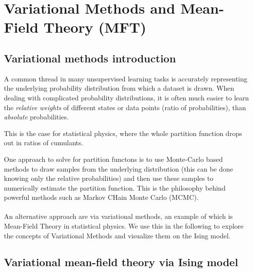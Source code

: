 \section{Variational Methods and Mean-Field Theory (MFT)}
\label{sec:varMFT}
\subsection{Variational methods introduction}
A common thread in many unsupervised learning tasks is accurately representing the underlying probability distribution from which a dataset is drawn. When dealing with complicated probability distributions, it is often much easier to learn the \emph{relative weights} of different states or data points (ratio of probabilities), than \emph{absolute} probabilities. 
\begin{example}
	This is the case for statistical physics, where the whole partition function drops out in ratios of cumulants. 
\end{example}
One approach to solve for partition functons is to use Monte-Carlo based methods to draw samples from the underlying distribution (this can be done knowing only the relative probabilities) and then use these samples to numerically estimate the partition function. This is the philosophy behind powerful methods such as Markov CHain Monte Carlo (MCMC).\\
\\
An alternative approach are via variational methods, an example of which is Mean-Field Theory in statistical physics. We use this in the following to explore the concepts of Variational Methods and visualize them on the Ising model.



\subsection{Variational mean-field theory via Ising model}

